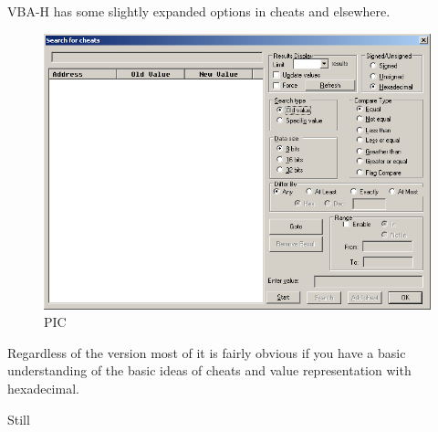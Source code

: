 \documentclass[
]{book}
\begin{document}
VBA-H has some slightly expanded options in cheats and elsewhere.

\begin{figure}
\centering
\includegraphics{images/195_home_fast6191_romhackingguide_unrenamed_fil___ginal_borders_romhackingguidegbavbahcheats1.png}
\caption{PIC}
\end{figure}

Regardless of the version most of it is fairly obvious if you have a basic understanding of the basic ideas of cheats and value representation with hexadecimal.

Still
\end{document}

